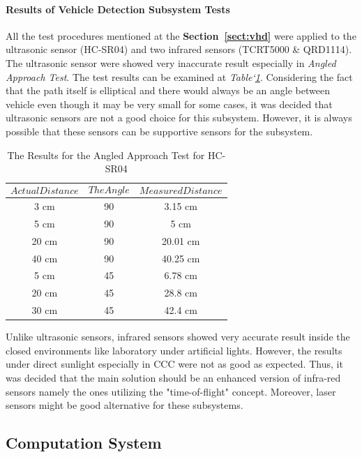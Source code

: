 \documentclass[a4paper,12pt]{article}
\begin{document}
	\paragraph{Results of Vehicle Detection Subsystem Tests}
	
		All the test procedures mentioned at the \textbf{Section~\ref{sect:vhd}} were applied to the ultrasonic sensor (HC-SR04) and two infrared sensors (TCRT5000 \& QRD1114). The ultrasonic sensor were showed very inaccurate result especially in \textit{Angled Approach Test}. The test results can be examined at \textit{Table`\ref{tab:aat}}. Considering the fact that the path itself is elliptical and there would always be an angle between vehicle even though it may be very small for some cases, it was decided that ultrasonic sensors are not a good choice for this subsystem. However, it is always possible that these sensors can be supportive sensors for the subsystem.
		
		\begin{table}[H]
		  \centering
		  	\caption{The Results for the Angled Approach Test for HC-SR04}
		    \begin{tabular}{c|c|c}
    		   $$Actual Distance$$ & $$The Angle$$ & $$Measured Distance$$ \\ \hline
			   3  cm & 90 & 3.15 cm  \\ \hline
    		   5  cm & 90 & 5 cm  \\ \hline
    		   20 cm & 90 & 20.01 cm  \\ \hline
    		   40 cm & 90 & 40.25 cm \\ \hline
       		   5  cm & 45 & 6.78 cm \\ \hline
    		   20 cm & 45 & 28.8 cm  \\ \hline
       		   30 cm & 45 & 42.4 cm  
  			\end{tabular}
  			\label{tab:aat}
		\end{table}
		
		 Unlike ultrasonic sensors, infrared sensors showed very accurate result inside the closed environments like laboratory under artificial lights. However, the results under direct sunlight especially in CCC were not as good as expected.  Thus, it was decided that the main solution should be an enhanced version of infra-red sensors namely the ones utilizing the "time-of-flight" concept. Moreover, laser sensors might be good alternative for these subsystems.
		
	\subsection{Computation System}
	
\end{document}
